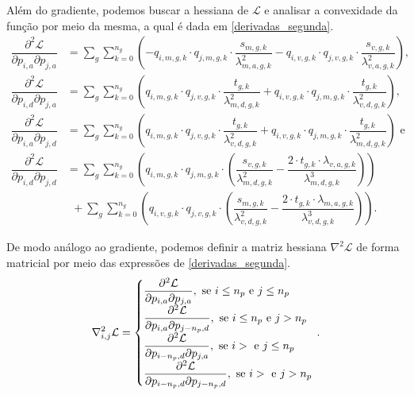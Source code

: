 Além do gradiente, podemos buscar a hessiana de $\mathcal{L}$ e analisar a convexidade da função por meio da mesma, a qual é dada em \ref{derivadas_segunda}.
\begin{equation}
    \begin{split}
        \dfrac{\partial^2 \mathcal{L}}{\partial p_{i, a} \partial p_{j, a}} & = \sum_{g}\sum_{k = 0}^{n_g} \left(- q_{i, m, g, k}\cdot q_{j, m, g, k}\cdot \dfrac{s_{m, g, k}}{\lambda_{m, a, g, k}^2} - q_{i, v, g, k}\cdot q_{j, v, g, k}\cdot \dfrac{s_{v, g, k}}{\lambda_{v, a, g, k}^2}\right), \\
        \dfrac{\partial^2 \mathcal{L}}{\partial p_{i, d} \partial p_{j, a}} & = \sum_{g}\sum_{k = 0}^{n_g} \left(q_{i, m, g, k}\cdot q_{j, v, g, k}\cdot \dfrac{t_{g, k}}{\lambda_{m, d, g, k}^2} + q_{i, v, g, k}\cdot q_{j, m, g, k}\cdot \dfrac{t_{g, k}}{\lambda_{v, d, g, k}^2}\right), \\
        \dfrac{\partial^2 \mathcal{L}}{\partial p_{i, a} \partial p_{j, d}} & = \sum_{g}\sum_{k = 0}^{n_g} \left(q_{i, m, g, k}\cdot q_{j, v, g, k}\cdot \dfrac{t_{g, k}}{\lambda_{v, d, g, k}^2} + q_{i, v, g, k}\cdot q_{j, m, g, k}\cdot \dfrac{t_{g, k}}{\lambda_{m, d, g, k}^2}\right) \text { e} \\
        \dfrac{\partial^2 \mathcal{L}}{\partial p_{i, d} \partial p_{j, d}} & = \sum_{g}\sum_{k = 0}^{n_g} \left(q_{i, m, g, k}\cdot q_{j, m, g, k}\cdot \left(\dfrac{s_{v, g, k}}{\lambda_{m, d, g, k}^2} - \dfrac{2\cdot t_{g, k}\cdot \lambda_{v, a, g, k}}{\lambda_{m, d, g, k}^3}\right)\right) \\
        & ~~ + \sum_{g}\sum_{k = 0}^{n_g} \left(q_{i, v, g, k}\cdot q_{j, v, g, k}\cdot \left(\dfrac{s_{m, g, k}}{\lambda_{v, d, g, k}^2} - \dfrac{2\cdot t_{g, k}\cdot \lambda_{m, a, g, k}}{\lambda_{v, d, g, k}^3}\right)\right).
    \end{split}
    \label{derivadas_segunda}
\end{equation}

De modo análogo ao gradiente, podemos definir a matriz hessiana $\nabla^2 \mathcal{L}$ de forma matricial por meio das expressões de \ref{derivadas_segunda}.
\begin{equation*}
    \nabla_{i, j}^2 \mathcal{L} = 
    \left\{
        \begin{array}{@{}l@{}}
            \dfrac{\partial^2 \mathcal{L}}{\partial p_{i, a} \partial p_{j, a}}, \text{ se } i \leq n_p \text{ e } j \leq n_p \\
            \dfrac{\partial^2 \mathcal{L}}{\partial p_{i, a} \partial p_{j - n_p, d}}, \text{ se } i \leq n_p \text{ e } j > n_p \\
            \dfrac{\partial^2 \mathcal{L}}{\partial p_{i - n_p, d} \partial p_{j, a}}, \text{ se } i > \text{ e } j \leq n_p \\
            \dfrac{\partial^2 \mathcal{L}}{\partial p_{i - n_p, d} \partial p_{j - n_p, d}}, \text{ se } i > \text{ e } j > n_p
        \end{array}
    \right.\,.
\end{equation*}

